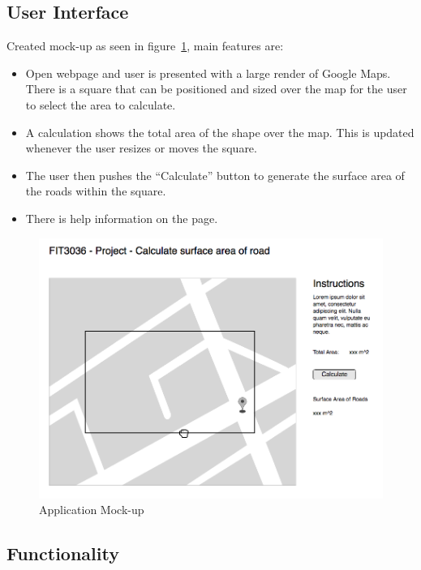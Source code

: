 \documentclass[a4paper,11pt]{article}
\begin{document}
\subsection{User Interface}

Created mock-up as seen in figure~\ref{fig:mockup}, main features are:

\begin{itemize}
  \item Open webpage and user is presented with a large render of Google Maps.
    There is a square that can be positioned and sized over the map for the user
    to select the area to calculate.
  \item A calculation shows the total area of the shape over the map. This is
    updated whenever the user resizes or moves the square.
  \item The user then pushes the ``Calculate'' button to generate the surface
    area of the roads within the square.
  \item There is help information on the page.
\end{itemize}

\begin{figure}[H]
  \includegraphics[width=\textwidth]{UI-mockup}
  \caption{Application Mock-up}\label{fig:mockup}
\end{figure}

\subsection{Functionality}

\end{document}
